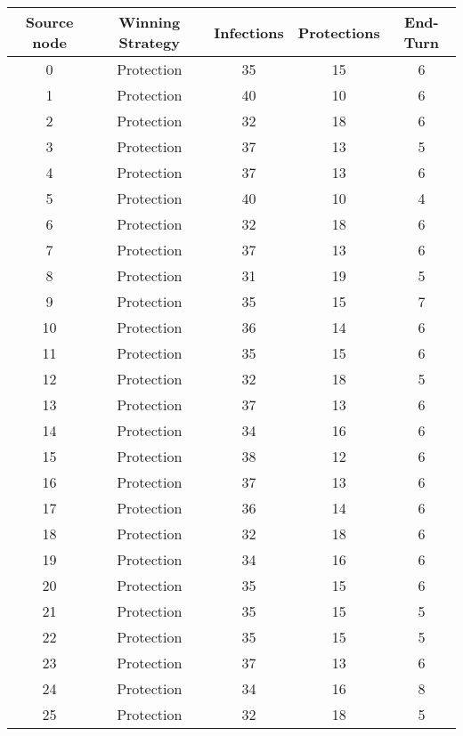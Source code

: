 \documentclass[results.tex]{subfiles}
\begin{document}
\begin{center}
  \begin{tabular}{| c || c | c | c | c |}
    \hline
    {\bfseries Source node} & {\bfseries Winning Strategy} & {\bfseries Infections} & {\bfseries Protections} & {\bfseries End-Turn} \\  %
    \hline\hline
    0 & Protection & 35 & 15 & 6 \\ 
    \hline
    1 & Protection & 40 & 10 & 6 \\ 
    \hline
    2 & Protection & 32 & 18 & 6 \\ 
    \hline
    3 & Protection & 37 & 13 & 5 \\ 
    \hline
    4 & Protection & 37 & 13 & 6 \\ 
    \hline
    5 & Protection & 40 & 10 & 4 \\ 
    \hline
    6 & Protection & 32 & 18 & 6 \\ 
    \hline
    7 & Protection & 37 & 13 & 6 \\ 
    \hline
    8 & Protection & 31 & 19 & 5 \\ 
    \hline
    9 & Protection & 35 & 15 & 7 \\ 
    \hline
    10 & Protection & 36 & 14 & 6 \\ 
    \hline
    11 & Protection & 35 & 15 & 6 \\ 
    \hline
    12 & Protection & 32 & 18 & 5 \\ 
    \hline
    13 & Protection & 37 & 13 & 6 \\ 
    \hline
    14 & Protection & 34 & 16 & 6 \\ 
    \hline
    15 & Protection & 38 & 12 & 6 \\ 
    \hline
    16 & Protection & 37 & 13 & 6 \\ 
    \hline
    17 & Protection & 36 & 14 & 6 \\ 
    \hline
    18 & Protection & 32 & 18 & 6 \\ 
    \hline
    19 & Protection & 34 & 16 & 6 \\ 
    \hline
    20 & Protection & 35 & 15 & 6 \\ 
    \hline
    21 & Protection & 35 & 15 & 5 \\ 
    \hline
    22 & Protection & 35 & 15 & 5 \\ 
    \hline
    23 & Protection & 37 & 13 & 6 \\ 
    \hline
    24 & Protection & 34 & 16 & 8 \\ 
    \hline
    25 & Protection & 32 & 18 & 5 \\ 

\end{tabular}
\end{center}
\end{document}
